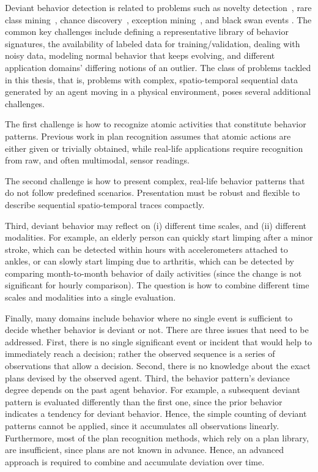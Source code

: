 Deviant behavior detection is related to problems such as novelty detection~\citep{Markou03}, rare class mining~\citep{Elkan01}, chance discovery~\citep{Ohsawa2009}, exception mining~\citep{Luo2008}, and black swan events \citep{Taleb2007}. The common key challenges include defining a representative library of behavior signatures, the availability of labeled data for training/validation, dealing with noisy data, modeling normal behavior that keeps evolving, and different application domains' differing notions of an outlier. The class of problems tackled in this thesis, that is, problems with complex, spatio-temporal sequential data generated by an agent moving in a physical environment, poses several additional challenges. 

The first challenge is how to recognize atomic activities that constitute behavior patterns. Previous work in plan recognition assumes that atomic actions are either given or trivially obtained, while real-life applications require recognition from raw, and often multimodal, sensor readings. 

The second challenge is how to present complex, real-life behavior patterns that do not follow predefined scenarios. Presentation must be robust and flexible to describe sequential spatio-temporal traces compactly.

Third, deviant behavior may reflect on (i) different time scales, and (ii) different modalities. For example, an elderly person can quickly start limping after a minor stroke, which can be detected within hours with accelerometers attached to ankles, or can slowly start limping due to arthritis, which can be detected by comparing month-to-month behavior of daily activities (since the change is not significant for hourly comparison). The question is how to combine different time scales and modalities into a single evaluation. 

Finally, many domains include behavior where no single event is sufficient to decide whether behavior is deviant or not. 
There are three issues that need to be addressed. First, there is no single significant event or incident that would help to immediately reach a decision; rather the observed sequence is a series of observations that allow a decision. Second, there is no knowledge about the exact plans devised by the observed agent. Third, the behavior pattern's deviance degree depends on the past agent behavior. For example, a subsequent deviant pattern is evaluated differently than the first one, since the prior behavior indicates a tendency for deviant behavior. Hence, the simple counting of deviant patterns cannot be applied, since it accumulates all observations linearly. Furthermore, most of the plan recognition methods, which rely on a plan library, are insufficient, since plans are not known in advance.
%
Hence, an advanced approach is required to combine and accumulate deviation over time. 


